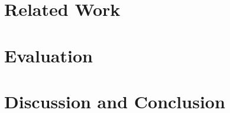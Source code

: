 \documentclass[10pt,b5paper,twoside]{book}
\begin{document}
    \setcounter{page}{1}

     
    \cleardoublepage

     
    \cleardoublepage

     
    \cleardoublepage
    
    \tableofcontents 
    \listoffigures 
    \listoftables 
    \lstlistoflistings 

    \cleardoublepage
    \setcounter{page}{1}
    
    

    \part{Related Work}
    
    
    

    \part{Evaluation}
    
    
    
    
    

    \part{Discussion and Conclusion}
    
    



    
    

    \begin{appendices}
    
    
    \end{appendices}
\end{document}
